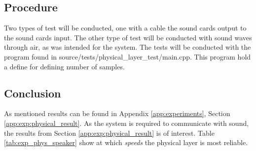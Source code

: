 	\subsection{Procedure}
	Two types of test will be conducted, one with a cable the sound cards output to the sound cards input. The other type of test will be conducted with sound waves through air, as was intended for the system.
	The tests will be conducted with the program found in source/tests/physical\_layer\_test/main.cpp. This program hold a define for defining number of samples.
	
	\subsection{Conclusion}
	As mentioned results can be found in Appendix \ref{app:experiments}, Section \ref{app:exp:physical_result}. As the system is required to communicate with sound, the results from Section \ref{app:exp:physical_result} is of interest. Table \ref{tab:exp_phys_speaker} show at which \textit{speeds} the physical layer is most reliable.